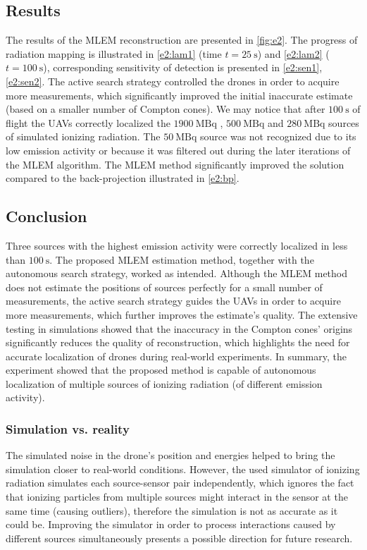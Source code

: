\subsection{Results}
The results of the \ac{MLEM} reconstruction are presented in \autoref{fig:e2}.
The progress of radiation mapping is illustrated in \autoref{e2:lam1} (time $t = \SI{25}{\second}$) and \autoref{e2:lam2} ($t = \SI{100}{\second}$), corresponding sensitivity of detection is presented in \autoref{e2:sen1}, \autoref{e2:sen2}.
The active search strategy controlled the drones in order to acquire more measurements, which significantly improved the initial inaccurate estimate (based on a smaller number of Compton cones).
We may notice that after $\SI{100}{\second}$ of flight the \ac{UAV}s correctly localized the $\SI{1900}{\mega\becquerel}$ , $\SI{500}{\mega\becquerel}$ and $\SI{280}{\mega\becquerel}$ sources of simulated ionizing radiation.
The $\SI{50}{\mega\becquerel}$ source was not recognized due to its low emission activity or because it was filtered out during the later iterations of the \ac{MLEM} algorithm.
The \ac{MLEM} method significantly improved the solution compared to the back-projection illustrated in \autoref{e2:bp}.

\subsection{Conclusion}
Three sources with the highest emission activity were correctly localized in less than $\SI{100}{\second}$.
The proposed \ac{MLEM} estimation method, together with the autonomous search strategy, worked as intended.
Although the \ac{MLEM} method does not estimate the positions of sources perfectly for a small number of measurements, the active search strategy guides the \ac{UAV}s in order to acquire more measurements, which further improves the estimate's quality.
The extensive testing in simulations showed that the inaccuracy in the Compton cones' origins significantly reduces the quality of reconstruction, which highlights the need for accurate localization of drones during real-world experiments.
In summary, the experiment showed that the proposed method is capable of autonomous localization of multiple sources of ionizing radiation (of different emission activity).




\subsubsection{Simulation vs. reality}
The simulated noise in the drone's position and energies helped to bring the simulation closer to real-world conditions.
However, the used simulator of ionizing radiation simulates each source-sensor pair independently, which ignores the fact that ionizing particles from multiple sources might interact in the sensor at the same time (causing outliers), therefore the simulation is not as accurate as it could be.
Improving the simulator in order to process interactions caused by different sources simultaneously presents a possible direction for future research.

